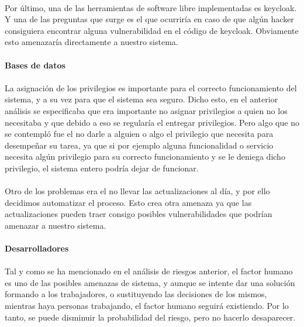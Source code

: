 \paragraph{}
Por último, una de las herramientas de software libre implementadas es keycloak. Y una de las preguntas que surge es el que ocurriría en caso de que algún hacker consiguiera encontrar alguna vulnerabilidad en el código de keycloak. Obviamente esto amenazaría directamente a nuestro sistema.
\paragraph{}
\textbf{Bases de datos}
\paragraph{}
La asignación de los privilegios es importante para el correcto funcionamiento del sistema, y a su vez para que el sistema sea seguro. Dicho esto, en el anterior análisis se especificaba que era importante no asignar privilegios a quien no los necesitaba y que debido a eso se regularía el entregar privilegios. Pero algo que no se contempló fue el no darle a alguien o algo el privilegio que necesita para desempeñar su tarea, ya que si por ejemplo alguna funcionalidad o servicio necesita algún privilegio para su correcto funcionamiento y se le deniega dicho privilegio, el sistema entero podría dejar de funcionar.
\paragraph{}
Otro de los problemas era el no llevar las actualizaciones al día, y por ello decidimos automatizar el proceso. Esto crea otra amenaza ya que las actualizaciones pueden traer consigo posibles vulnerabilidades que podrían amenazar a nuestro sistema.
\paragraph{}
\textbf{Desarrolladores}
\paragraph{}
Tal y como se ha mencionado en el análisis de riesgos anterior, el factor humano es uno de las posibles amenazas de sistema, y aunque se intente dar una solución formando a los trabajadores, o sustituyendo las decisiones de los mismos, mientras haya personas trabajando, el factor humano seguirá existiendo. Por lo tanto, se puede disminuir la probabilidad del riesgo, pero no hacerlo desaparecer.
